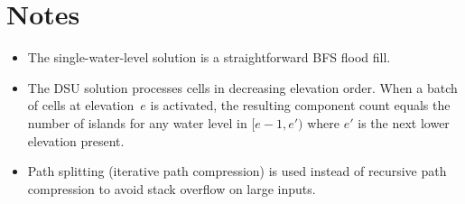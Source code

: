 \documentclass[11pt,a4paper]{article}
\begin{document}
\section{Notes}

\begin{itemize}
  \item The single-water-level solution is a straightforward BFS flood fill.
  \item The DSU solution processes cells in decreasing elevation order. When
    a batch of cells at elevation~$e$ is activated, the resulting component
    count equals the number of islands for any water level in $[e-1, e')$
    where $e'$ is the next lower elevation present.
  \item Path splitting (iterative path compression) is used instead of
    recursive path compression to avoid stack overflow on large inputs.
\end{itemize}
\end{document}
